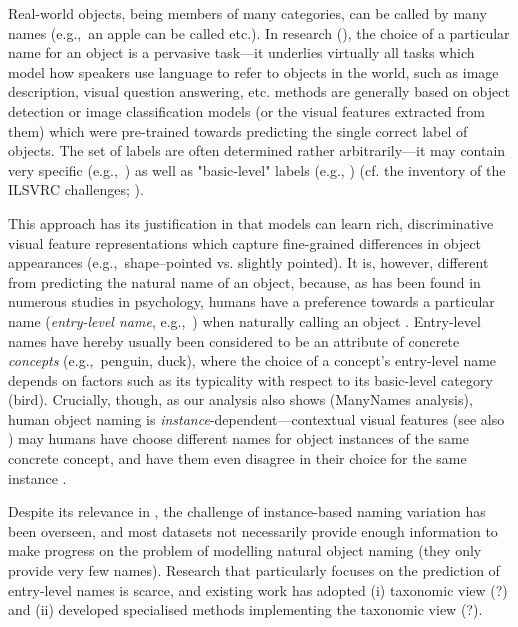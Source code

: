 
Real-world objects, being members of many categories, can be called by many names (e.g.,\ an apple can be called  etc.). 
In \langvis research (\lv), the choice of a particular name for an object is a pervasive task---it underlies virtually all tasks which model how speakers use language to refer to objects in the world, such as image description, visual question answering, etc. 
%
\lv methods are generally based on object detection or image classification models (or the visual features extracted from them) which were pre-trained towards predicting the single correct label of objects. The set of labels are often determined rather arbitrarily---it may contain very specific (e.g.,\ ) as well as "basic-level" labels (e.g., ) (cf. the inventory of the ILSVRC challenges; \citealt{ILSVRC15}). 

This approach has its justification in that models can learn rich, discriminative visual feature representations which capture fine-grained differences in object appearances (e.g.,\ shape--pointed vs. slightly pointed). 
It is, however, different from predicting the natural name of an object, 
because, as has been found in numerous studies in psychology, humans have a preference towards a particular name (\textit{entry-level name}, e.g.,\ ) when naturally calling an object  \cite{rosch1976basic,Rosch1978,jolicoeur1984pictures}. 
Entry-level names have hereby usually been considered to be an attribute of concrete \textit{concepts} (e.g.,\ penguin, duck), where the choice of a concept's entry-level name depends on factors such as its typicality with respect to its basic-level category (bird).  
Crucially, though, as our analysis also shows (ManyNames analysis), human object naming is \textit{instance}-dependent---contextual visual features (see also \citet{graf2016animal}) may humans have choose different names for object instances of the same concrete concept, and have them even disagree in their choice for the same instance . 

Despite its relevance in \lv, the challenge of instance-based naming variation has been overseen, and most \lv datasets not necessarily provide enough information to make progress on the problem of modelling natural object naming (they only provide very few names). 
Research that particularly focuses on the prediction of entry-level names is scarce, and existing work has adopted (i) taxonomic view (?) and (ii) developed specialised methods implementing the taxonomic view (?)\cite{Ordonez:2016}. 

